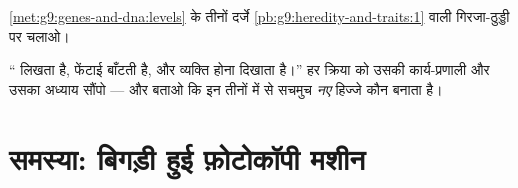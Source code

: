 \begin{exercise}[$\star\star$]\label{exo:g9:genes-and-dna:11}
\cref{met:g9:genes-and-dna:levels} के तीनों दर्जे
\cref{pb:g9:heredity-and-traits:1} वाली गिरजा-ठुड्डी पर चलाओ।
\end{exercise}

\begin{exercise}[$\star\star\star$]\label{exo:g9:genes-and-dna:12}
`` लिखता है, फेंटाई बाँटती है, और व्यक्ति होना दिखाता है।''
हर क्रिया को उसकी कार्य-प्रणाली और उसका अध्याय सौंपो --- और बताओ कि इन
तीनों में से सचमुच \emph{नए} हिज्जे कौन बनाता है।
\end{exercise}

\section{समस्या: बिगड़ी हुई फ़ोटोकॉपी मशीन}

